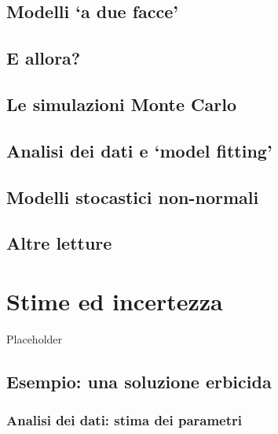 \documentclass[a4paper,12pt,oneside]{book}
\begin{document}
\hypertarget{modelli-a-due-facce}{%
\section{Modelli `a due facce'}\label{modelli-a-due-facce}}

\hypertarget{e-allora}{%
\section{E allora?}\label{e-allora}}

\hypertarget{le-simulazioni-monte-carlo}{%
\section{Le simulazioni Monte Carlo}\label{le-simulazioni-monte-carlo}}

\hypertarget{analisi-dei-dati-e-model-fitting}{%
\section{Analisi dei dati e `model fitting'}\label{analisi-dei-dati-e-model-fitting}}

\hypertarget{modelli-stocastici-non-normali}{%
\section{Modelli stocastici non-normali}\label{modelli-stocastici-non-normali}}

\hypertarget{altre-letture-3}{%
\section{Altre letture}\label{altre-letture-3}}

\hypertarget{stime-ed-incertezza}{%
\chapter{Stime ed incertezza}\label{stime-ed-incertezza}}

Placeholder

\hypertarget{esempio-una-soluzione-erbicida}{%
\section{Esempio: una soluzione erbicida}\label{esempio-una-soluzione-erbicida}}

\hypertarget{analisi-dei-dati-stima-dei-parametri}{%
\subsection{Analisi dei dati: stima dei parametri}\label{analisi-dei-dati-stima-dei-parametri}}
\end{document}
